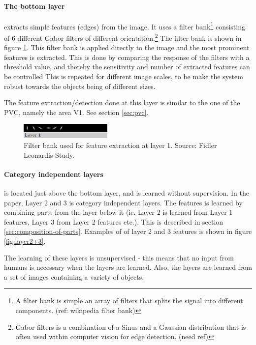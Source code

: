 \paragraph*{The bottom layer} extracts simple features (edges) from the image. It uses a filter bank\footnote{A filter bank is simple an array of filters that splits the signal into different components. (ref: wikipedia filter bank)}
 consisting of 6 different Gabor filters of different orientation.\footnote{Gabor filters is a combination of a Sinus and a Gaussian distribution that is often used within computer vision for edge detection. (need ref)} 
The filter bank is shown in figure \ref{fig:filterbank}. 
This filter bank is applied directly to the image and the most prominent features is extracted. 
This is done by comparing the response of the filters with a threshold value, and thereby the sensitivity and number of extracted features can be controlled
This is repeated for different image scales, to be make the system robust towards the objects being of different sizes. 


The feature extraction/detection done at this layer is similar to the one of the PVC, namely the area V1. See section \ref{sec:pvc}. 


\begin{figure}[h!] %
\centering
\includegraphics[width=0.4\textwidth]{graphics/layer1_features}
\caption{Filter bank used for feature extraction at layer 1. Source: Fidler Leonardis Study. }
\label{fig:filterbank}
\end{figure}

\paragraph*{Category independent layers} is located just above the bottom layer, and is learned without supervision. In the paper, Layer 2 and 3 is category independent layers.  The features is learned by combining parts from the layer below it (ie. Layer 2 is learned from Layer 1 features, Layer 3 from Layer 2 features etc.). This is described in section \ref{sec:composition-of-parts}. Examples of of layer 2 and 3 features is shown in figure \ref{fig:layer2+3}. 

The learning of these layers is unsupervised - this means that no input from humans is necessary when the layers are learned. Also, the layers are learned from a set of images containing a variety of objects. 


